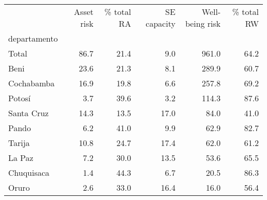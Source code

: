 \begin{tabular}{lrrrrr}
\toprule
{} &  Asset risk &  \% total RA &  SE capacity &  Well-being risk &  \% total RW \\
departamento &             &             &              &                  &             \\
\midrule
Total        &        86.7 &        21.4 &          9.0 &            961.0 &        64.2 \\
Beni         &        23.6 &        21.3 &          8.1 &            289.9 &        60.7 \\
Cochabamba   &        16.9 &        19.8 &          6.6 &            257.8 &        69.2 \\
Potosí       &         3.7 &        39.6 &          3.2 &            114.3 &        87.6 \\
Santa Cruz   &        14.3 &        13.5 &         17.0 &             84.0 &        41.0 \\
Pando        &         6.2 &        41.0 &          9.9 &             62.9 &        82.7 \\
Tarija       &        10.8 &        24.7 &         17.4 &             62.0 &        61.2 \\
La Paz       &         7.2 &        30.0 &         13.5 &             53.6 &        65.5 \\
Chuquisaca   &         1.4 &        44.3 &          6.7 &             20.5 &        86.3 \\
Oruro        &         2.6 &        33.0 &         16.4 &             16.0 &        56.4 \\
\bottomrule
\end{tabular}
